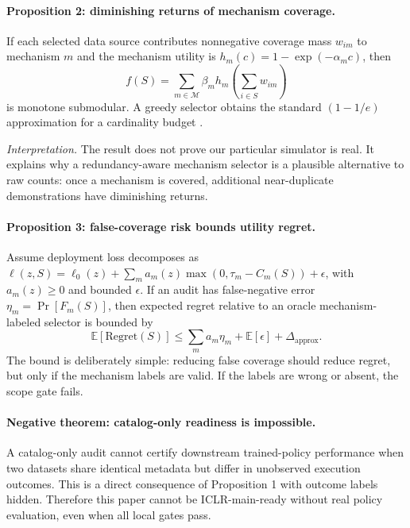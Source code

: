 \documentclass{article}
\begin{document}
\paragraph{Proposition 2: diminishing returns of mechanism coverage.}
If each selected data source contributes nonnegative coverage mass $w_{im}$ to mechanism $m$ and the mechanism utility is $h_m(c)=1-\exp(-\alpha_m c)$, then
\[
  f(S)=\sum_{m\in\mathcal{M}}\beta_m h_m\left(\sum_{i\in S}w_{im}\right)
\]
is monotone submodular. A greedy selector obtains the standard $(1-1/e)$ approximation for a cardinality budget \citep{nemhauser1978submodular,krause2014submodular}.

\textit{Interpretation.}
The result does not prove our particular simulator is real. It explains why a redundancy-aware mechanism selector is a plausible alternative to raw counts: once a mechanism is covered, additional near-duplicate demonstrations have diminishing returns.

\paragraph{Proposition 3: false-coverage risk bounds utility regret.}
Assume deployment loss decomposes as $\ell(z,S)=\ell_0(z)+\sum_m a_m(z)\max(0,\tau_m-C_m(S))+\epsilon$, with $a_m(z)\ge0$ and bounded $\epsilon$. If an audit has false-negative error $\eta_m=\Pr[F_m(S)]$, then expected regret relative to an oracle mechanism-labeled selector is bounded by
\[
  \mathbb{E}[\mathrm{Regret}(S)] \le \sum_m a_m \eta_m + \mathbb{E}[\epsilon] + \Delta_{\mathrm{approx}}.
\]
The bound is deliberately simple: reducing false coverage should reduce regret, but only if the mechanism labels are valid. If the labels are wrong or absent, the scope gate fails.

\paragraph{Negative theorem: catalog-only readiness is impossible.}
A catalog-only audit cannot certify downstream trained-policy performance when two datasets share identical metadata but differ in unobserved execution outcomes. This is a direct consequence of Proposition 1 with outcome labels hidden. Therefore this paper cannot be ICLR-main-ready without real policy evaluation, even when all local gates pass.
\end{document}

